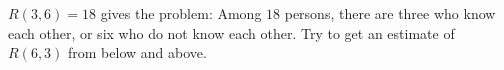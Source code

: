$R(3, 6) = 18$ gives the problem: Among $18$ persons, there are three who know each other, or six who do not know each other. Try to get an estimate of $R(6, 3)$ from below and above.
